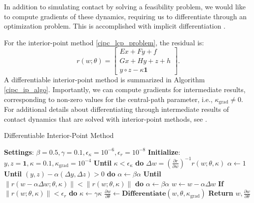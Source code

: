In addition to simulating contact by solving a feasibility problem, we would like to compute gradients of these dynamics, requiring us to differentiate through an optimization problem. This is accomplished with implicit differentiation \cite{dini1907lezioni}.

For the interior-point method \eqref{cipc_lcp_problem}, the residual is:
\begin{equation}
	r(w; \theta) = \begin{bmatrix} E x + F y + f \\ G x + H y + z + h \\ y \circ z - \kappa \textbf{1}\end{bmatrix}.
\end{equation}
A differentiable interior-point method is summarized in Algorithm \ref{cipc_ip_algo}. Importantly, we can compute gradients for intermediate results, corresponding to non-zero values for the central-path parameter, i.e., $\kappa_{\mbox{grad}} \neq 0$. For additional details about differentiating through intermediate results of contact dynamics that are solved with interior-point methods, see \cite{howell2022dojo}.

\begin{algorithm}[H]
	\caption{Differentiable Interior-Point Method}\label{cipc_ip_algo}
	\begin{algorithmic}[1]
		\State \textbf{Settings}: $\beta = 0.5, \gamma = 0.1, \epsilon_{\kappa} = 10^{-6}, \epsilon_{r} = 10^{-8}$
		\State \textbf{Initialize}: $y, z = \mathbf{1}, \kappa = 0.1, \kappa_{\mbox{grad}} = 10^{-4}$
		\State \textbf{Until} $\kappa < \epsilon_{\kappa}$ \textbf{do} 
		\State \indent $\Delta w = (\frac{\partial r}{\partial w})^{-1} r(w; \theta, \kappa)$
		\State \indent $\alpha \leftarrow 1$
		\State \indent \textbf{Until} $(y, z) - \alpha (\Delta y, \Delta z) > 0$ \textbf{do} $\alpha \leftarrow \beta \alpha$
		\State \indent \textbf{Until} $\|r(w-\alpha\Delta w; \theta, \kappa)\| < \|r(w; \theta, \kappa)\|$ \textbf{do}
		\State \indent \indent $\alpha \leftarrow \beta \alpha$
		\State \indent $w \leftarrow w - \alpha \Delta w$
		\State \indent \textbf{If} $\|r(w; \theta, \kappa)\| < \epsilon_{r}$ \textbf{do} $\kappa \leftarrow \gamma \kappa$
		\State $\frac{\partial w}{\partial \theta} \leftarrow \textbf{Differentiate}(w, \theta, \kappa_{\mbox{grad}})$ 
		\State \textbf{Return} $w, \frac{\partial w}{\partial \theta}$ 
		\EndProcedure
	\end{algorithmic}
\end{algorithm}

